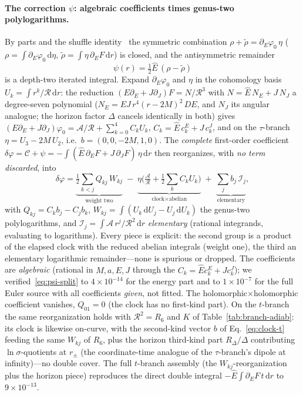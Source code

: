 \documentclass[12pt]{iopart}
\newcommand{\Ehat}{\hat E}
\newcommand{\dd}{\mathrm{d}}
\begin{document}
\paragraph{The correction $\psi$: algebraic coefficients times genus-two
polylogarithms.} By parts and the shuffle identity~\cite{Chen1977} the symmetric
combination $\rho+\tilde\rho=\partial_E\varphi_0\,\eta$
($\rho=\int\partial_E\varphi_0\,\dd\eta$,
$\tilde\rho=\int\eta\,\partial_E F\,\dd r$) is closed, and the antisymmetric
remainder
\begin{equation}
    \psi(r)=\tfrac12\Ehat\,(\rho-\tilde\rho)
    \label{eq:psi-irr}
\end{equation}
is a depth-two iterated integral. Expand $\partial_E\varphi_0$ and $\eta$ in the
cohomology basis $U_k=\int r^k/\mathcal{R}\,\dd r$: the reduction
$(E\partial_E+J\partial_J)F=N/\mathcal{R}^3$ with $N=\Ehat\,N_E+J\,N_J$ a degree-seven
polynomial ($N_E=EJ\,r^4(r-2M)^2\,DE$, and $N_J$ its angular analogue; the horizon
factor $\Delta$ cancels identically in both) gives
$(E\partial_E+J\partial_J)\varphi_0=\mathcal{A}/\mathcal{R}+\sum_{k=0}^{4} C_k U_k$,
$C_k=\Ehat\,c_k^{E}+J\,c_k^{J}$, and on the
$\tau$-branch $\eta=U_3-2M\,U_2$, i.e.\ $b=(0,0,-2M,1,0)$. The \emph{complete}
first-order coefficient $\delta\varphi=\mathcal{C}+\psi=-\!\int(\Ehat\,\partial_E F
+J\,\partial_J F)\,\eta\,\dd r$ then reorganizes, with \emph{no term discarded}, into
\begin{equation}
    \delta\varphi=
    \underbrace{\tfrac12\!\sum_{k<j}Q_{kj}\,W_{kj}}_{\text{weight two}}
    \;-\;\underbrace{\eta\Big(\tfrac{\mathcal{A}}{\mathcal{R}}
    +\tfrac12\!\sum_k C_k U_k\Big)}_{\text{clock}\times\text{abelian}}
    \;+\;\underbrace{\sum_j b_j\,\mathcal{I}_j}_{\text{elementary}},
    \label{eq:psi-split}
\end{equation}
with $Q_{kj}=C_k b_j-C_j b_k$, $W_{kj}=\int(U_k\,\dd U_j-U_j\,\dd U_k)$ the
genus-two polylogarithms, and $\mathcal{I}_j=\int\mathcal{A}\,r^j/\mathcal{R}^2\,
\dd r$ \emph{elementary} (rational integrands, evaluating to logarithms). Every
piece is explicit: the second group is a product of the elapsed clock with the
reduced abelian integrals (weight one), the third an elementary logarithmic
remainder---none is spurious or dropped. The coefficients are \emph{algebraic}
(rational in $M,a,E,J$ through the $C_k=\Ehat c_k^E+J c_k^J$); we
verified~\eqref{eq:psi-split} to $4\times10^{-14}$ for the energy part and to
$1\times10^{-7}$ for the full Euler source with all coefficients \emph{given}, not
fitted. The
holomorphic$\times$holomorphic coefficient vanishes, $Q_{01}=0$ (the clock has no
first-kind part). On the $t$-branch the same reorganization holds with
$\mathcal{R}^2=R_6$ and $K$ of Table~\ref{tab:branch-adiab}: its clock is likewise
on-curve, with the second-kind vector $b$ of Eq.~\eqref{eq:clock-t} feeding the same
$W_{kj}$ of $R_6$, plus the horizon third-kind part $R_\Delta/\Delta$ contributing
$\ln\sigma$-quotients at $r_\pm$ (the coordinate-time analogue of the $\tau$-branch's
dipole at infinity)---no double cover. The full $t$-branch assembly (the
$W_{kj}$-reorganization plus the horizon piece) reproduces the direct double integral
$-\Ehat\!\int\!\partial_E F\,t\,\dd r$ to $9\times10^{-13}$.
\end{document}
